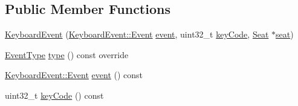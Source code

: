 \subsection*{Public Member Functions}
\begin{DoxyCompactItemize}
\item 
\hyperlink{classmotorcar_1_1KeyboardEvent_a06138cdfae36aa5cc374f921ff66f868}{Keyboard\-Event} (\hyperlink{classmotorcar_1_1KeyboardEvent_a160494213466e8fd37ad7b84f0246df6}{Keyboard\-Event\-::\-Event} \hyperlink{classmotorcar_1_1KeyboardEvent_afcaf3f2e053934ccea4b1b44869e8e16}{event}, uint32\-\_\-t \hyperlink{classmotorcar_1_1KeyboardEvent_a1bb9217c0f442aef7f1aa2461e9e6cf4}{key\-Code}, \hyperlink{classmotorcar_1_1Seat}{Seat} $\ast$\hyperlink{classmotorcar_1_1Event_a7426828c8402193cac63a7b3fda5a17e}{seat})
\item 
\hyperlink{classmotorcar_1_1Event_af4f5d9ed7dc2d8a2324fa5b0d32c29b0}{Event\-Type} \hyperlink{classmotorcar_1_1KeyboardEvent_abb35a59eab2d715433ef46868a69df68}{type} () const override
\item 
\hyperlink{classmotorcar_1_1KeyboardEvent_a160494213466e8fd37ad7b84f0246df6}{Keyboard\-Event\-::\-Event} \hyperlink{classmotorcar_1_1KeyboardEvent_afcaf3f2e053934ccea4b1b44869e8e16}{event} () const 
\item 
uint32\-\_\-t \hyperlink{classmotorcar_1_1KeyboardEvent_a1bb9217c0f442aef7f1aa2461e9e6cf4}{key\-Code} () const 
\end{DoxyCompactItemize}


